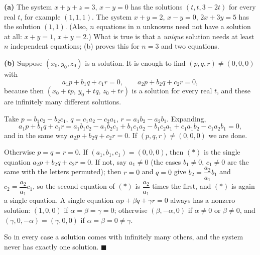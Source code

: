 \textbf{(a)} The system $x+y+z=3$, $x-y=0$ has the solutions $(t,t,3-2t)$ for every real $t$, for example $(1,1,1)$. The system $x+y=2$, $x-y=0$, $2x+3y=5$ has the solution $(1,1)$. (Also, $n$ equations in $n$ unknowns need not have a solution at all: $x+y=1$, $x+y=2$.) What is true is that a \emph{unique} solution needs at least $n$ independent equations; (b) proves this for $n=3$ and two equations.

\textbf{(b)} Suppose $(x_0,y_0,z_0)$ is a solution. It is enough to find $(p,q,r)\ne(0,0,0)$ with
\[a_1p+b_1q+c_1r=0,\qquad a_2p+b_2q+c_2r=0,\tag{$*$}\]
because then $(x_0+tp,\,y_0+tq,\,z_0+tr)$ is a solution for every real $t$, and these are infinitely many different solutions.

Take $p=b_1c_2-b_2c_1$, $q=c_1a_2-c_2a_1$, $r=a_1b_2-a_2b_1$. Expanding,
\[a_1p+b_1q+c_1r=a_1b_1c_2-a_1b_2c_1+b_1c_1a_2-b_1c_2a_1+c_1a_1b_2-c_1a_2b_1=0,\]
and in the same way $a_2p+b_2q+c_2r=0$. If $(p,q,r)\ne(0,0,0)$ we are done.

Otherwise $p=q=r=0$. If $(a_1,b_1,c_1)=(0,0,0)$, then $(*)$ is the single equation $a_2p+b_2q+c_2r=0$. If not, say $a_1\ne0$ (the cases $b_1\ne0$, $c_1\ne0$ are the same with the letters permuted); then $r=0$ and $q=0$ give $b_2=\dfrac{a_2}{a_1}b_1$ and $c_2=\dfrac{a_2}{a_1}c_1$, so the second equation of $(*)$ is $\dfrac{a_2}{a_1}$ times the first, and $(*)$ is again a single equation. A single equation $\alpha p+\beta q+\gamma r=0$ always has a nonzero solution: $(1,0,0)$ if $\alpha=\beta=\gamma=0$; otherwise $(\beta,-\alpha,0)$ if $\alpha\ne0$ or $\beta\ne0$, and $(\gamma,0,-\alpha)=(\gamma,0,0)$ if $\alpha=\beta=0\ne\gamma$.

So in every case a solution comes with infinitely many others, and the system never has exactly one solution. $\blacksquare$
